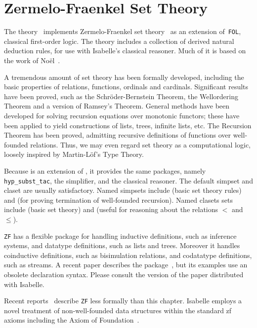 \chapter{Zermelo-Fraenkel Set Theory}

The theory~ implements Zermelo-Fraenkel set
theory~\cite{halmos60,suppes72} as an extension of~{\tt FOL}, classical
first-order logic.  The theory includes a collection of derived natural
deduction rules, for use with Isabelle's classical reasoner.  Much
of it is based on the work of No\"el~\cite{noel}.

A tremendous amount of set theory has been formally developed, including
the basic properties of relations, functions, ordinals and cardinals.
Significant results have been proved, such as the Schr\"oder-Bernstein
Theorem, the Wellordering Theorem and a version of Ramsey's Theorem.
General methods have been developed for solving recursion equations over
monotonic functors; these have been applied to yield constructions of
lists, trees, infinite lists, etc.  The Recursion Theorem has been proved,
admitting recursive definitions of functions over well-founded relations.
Thus, we may even regard set theory as a computational logic, loosely
inspired by Martin-L\"of's Type Theory.

Because {\ZF} is an extension of {\FOL}, it provides the same packages, namely
{\tt hyp_subst_tac}, the simplifier, and the classical reasoner.  The default
simpset and claset are usually satisfactory.  Named simpsets include
 (basic set theory rules) and  (for
proving termination of well-founded recursion).  Named clasets sets include
 (basic set theory) and  (useful for
reasoning about the relations $<$ and $\le$).

{\tt ZF} has a flexible package for handling inductive definitions,
such as inference systems, and datatype definitions, such as lists and
trees.  Moreover it handles coinductive definitions, such as
bisimulation relations, and codatatype definitions, such as streams.  A
recent paper describes the package~\cite{paulson-CADE}, but its examples
use an obsolete declaration syntax.  Please consult the version of the
paper distributed with Isabelle.

Recent reports~\cite{paulson-set-I,paulson-set-II} describe {\tt ZF} less
formally than this chapter.  Isabelle employs a novel treatment of
non-well-founded data structures within the standard {\sc zf} axioms including
the Axiom of Foundation~\cite{paulson-final}.


